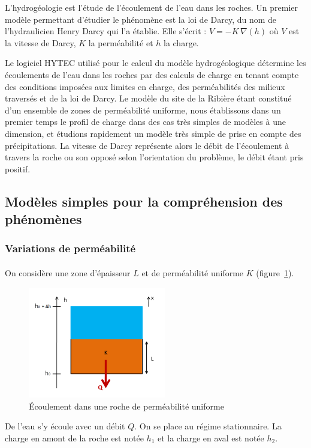 \documentclass{article}
\begin{document}
L’hydrogéologie est l’étude de l’écoulement de l’eau dans les roches. Un premier modèle permettant d’étudier le phénomène est la loi de Darcy, du nom de l’hydraulicien Henry Darcy qui l’a établie. Elle s’écrit : $V = - K \, \nabla(h)$ où $V$ est la vitesse de Darcy, $K$ la perméabilité et $h$ la charge. %

Le logiciel HYTEC utilisé pour le calcul du modèle hydrogéologique détermine les écoulements de l’eau dans les roches par des calculs de charge en tenant compte des conditions imposées aux limites en charge, des perméabilités des milieux traversés et de la loi de Darcy. Le modèle du site de la Ribière étant constitué d’un ensemble de zones de perméabilité uniforme, nous établissons dans un premier temps le profil de charge dans des cas très simples de modèles à une dimension, et étudions rapidement un modèle très simple de prise en compte des précipitations. La vitesse de Darcy représente alors le débit de l’écoulement à travers la roche ou son opposé selon l'orientation du problème, le débit étant pris positif.

\subsection{Modèles simples pour la compréhension des phénomènes}
\subsubsection{Variations de perméabilité}
\paragraph{} On considère une zone d’épaisseur $L$ et de perméabilité uniforme $K$ (figure~\ref{fig:ecoulement_permea_uniforme}).

\begin{figure}[H]
    \centering
    \includegraphics[width=6cm]{A_III_B_1.png}
    \caption{Écoulement dans une roche de perméabilité uniforme}
    \label{fig:ecoulement_permea_uniforme}
\end{figure}
De l’eau s’y écoule avec un débit $Q$. On se place au régime stationnaire. La charge en amont de la roche est notée $h_1$ et la charge en aval est notée $h_2$.
\end{document}
